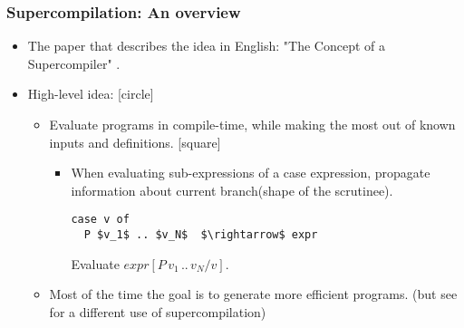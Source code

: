 \documentclass{beamer}
\begin{document}
\begin{frame}[fragile]

    \frametitle{Supercompilation: An overview}

    \begin{itemize}[<+->]
        \item
            The paper that describes the idea in English: "The Concept of a
            Supercompiler" \citet{Turchin86theconcept}.
        \item
            High-level idea:
            [circle]
            \begin{itemize}
                \item
                    Evaluate programs in compile-time, while making the most out
                    of known inputs and definitions.
                    [square]
                    \begin{itemize}[]
                        \item
                            When evaluating sub-expressions of a case
                            expression, propagate information about current
                            branch(shape of the scrutinee).
                            \begin{lstlisting}[mathescape]
case v of
  P $v_1$ .. $v_N$  $\rightarrow$ expr
                            \end{lstlisting}

                            Evaluate $expr [ P\, v_1\, ..\, v_N \slash v ]$.
                    \end{itemize}
                \item
                    Most of the time the goal is to generate more efficient
                    programs. (but see \citet{Klyuchnikov2010proving} for a
                    different use of supercompilation)
            \end{itemize}
    \end{itemize}

\end{frame}
\end{document}
